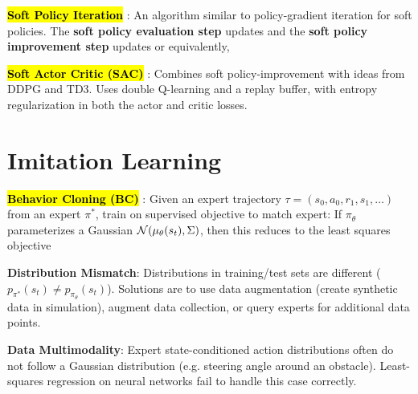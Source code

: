 \documentclass{article}
\begin{document}
  \hl{\textbf{Soft Policy Iteration}} \cite{haarnoja2018soft}: An algorithm similar to policy-gradient iteration for soft policies. The \textbf{soft policy evaluation step} updates
  and the \textbf{soft policy improvement step} updates
  or equivalently,

  \hl{\textbf{Soft Actor Critic (SAC)}} \cite{haarnoja2018soft}: Combines soft policy-improvement with ideas from DDPG and TD3. Uses double Q-learning and a replay buffer, with entropy regularization in both the actor and critic losses.

\section{Imitation Learning}

  \hl{\textbf{Behavior Cloning (BC)}} \cite{ross2011reduction}: Given an expert trajectory $\tau=(s_0,a_0,r_1,s_1,\dots)$ from an expert $\pi^*$, train on supervised objective to match expert:
  If $\pi_\theta$ parameterizes a Gaussian $\mathcal{N}(\mu_\theta(s_t),\Sigma)$, then this reduces to the least squares objective

  \textbf{Distribution Mismatch}: Distributions in training/test sets are different ($p_{\pi^*}(s_t)\neq p_{\pi_\theta}(s_t)$). Solutions are to use data augmentation (create synthetic data in simulation), augment data collection, or query experts for additional data points.

  \textbf{Data Multimodality}: Expert state-conditioned action distributions often do not follow a Gaussian distribution (e.g. steering angle around an obstacle). Least-squares regression on neural networks fail to handle this case correctly.
\end{document}
